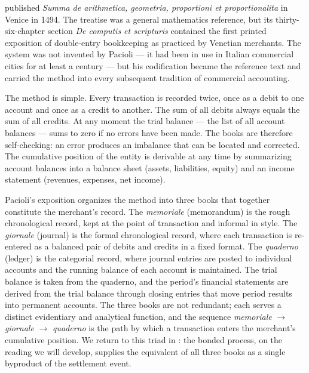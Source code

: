 \documentclass[11pt,a4paper]{article}
\theoremstyle{definition}
\theoremstyle{remark}
\begin{document}
\citet{pacioli1494summa} published \emph{Summa de arithmetica,
geometria, proportioni et proportionalita} in Venice in 1494.
The treatise was a general mathematics reference, but its
thirty-six-chapter section \emph{De computis et scripturis}
contained the first printed exposition of double-entry
bookkeeping as practiced by Venetian merchants. The system was
not invented by Pacioli --- it had been in use in Italian
commercial cities for at least a century --- but his
codification became the reference text and carried the method
into every subsequent tradition of commercial accounting.

The method is simple. Every transaction is recorded twice,
once as a debit to one account and once as a credit to
another. The sum of all debits always equals the sum of all
credits. At any moment the trial balance --- the list of all
account balances --- sums to zero if no errors have been made.
The books are therefore self-checking: an error produces an
imbalance that can be located and corrected. The cumulative
position of the entity is derivable at any time by summarizing
account balances into a balance sheet (assets, liabilities,
equity) and an income statement (revenues, expenses, net
income).

Pacioli's exposition organizes the method into three books that
together constitute the merchant's record. The \emph{memoriale}
(memorandum) is the rough chronological record, kept at the point
of transaction and informal in style. The \emph{giornale} (journal)
is the formal chronological record, where each transaction is
re-entered as a balanced pair of debits and credits in a fixed
format. The \emph{quaderno} (ledger) is the categorial record,
where journal entries are posted to individual accounts and the
running balance of each account is maintained. The trial balance
is taken from the quaderno, and the period's financial statements
are derived from the trial balance through closing entries that
move period results into permanent accounts. The three books are
not redundant; each serves a distinct evidentiary and analytical
function, and the sequence \emph{memoriale} $\to$ \emph{giornale}
$\to$ \emph{quaderno} is the path by which a transaction enters
the merchant's cumulative position. We return to this triad in
: the bonded process, on the reading
we will develop, supplies the equivalent of all three books as a
single byproduct of the settlement event.
\end{document}
